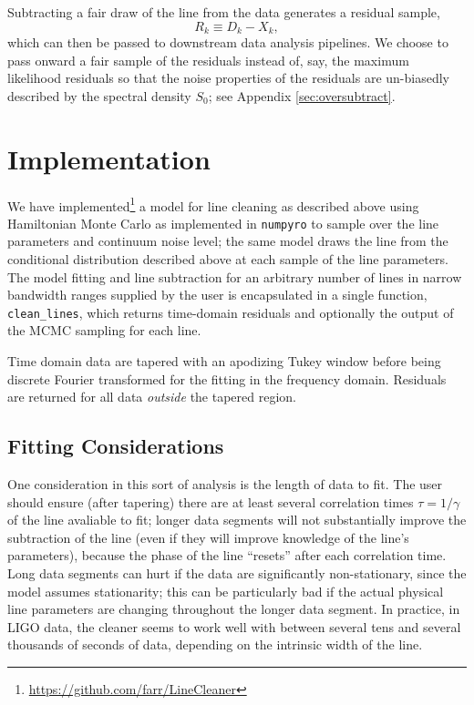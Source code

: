 \documentclass[modern]{aastex631}
\begin{document}
Subtracting a fair draw of the line from the data generates a residual sample, 
\begin{equation}
    R_k \equiv D_k - X_k,
\end{equation}
which can then be passed to downstream data analysis pipelines.  We choose to
pass onward a fair sample of the residuals instead of, say, the maximum
likelihood residuals so that the noise properties of the residuals are
un-biasedly described by the spectral density $S_0$; see Appendix
\ref{sec:oversubtract}.

\section{Implementation}

We have implemented\footnote{\url{https://github.com/farr/LineCleaner}} a model for
line cleaning as described above using Hamiltonian Monte Carlo \citep{Neal2011}
as implemented in \texttt{numpyro} \cite{bingham2019pyro,phan2019composable} to
sample over the line parameters and continuum noise level; the same model draws
the line from the conditional distribution described above at each sample of the
line parameters.  The model fitting and line subtraction for an arbitrary number
of lines in narrow bandwidth ranges supplied by the user is encapsulated in a
single function, \texttt{clean\_lines}, which returns time-domain residuals and
optionally the output of the MCMC sampling for each line.

Time domain data are tapered with an apodizing Tukey window before being
discrete Fourier transformed for the fitting in the frequency domain.  Residuals
are returned for all data \emph{outside} the tapered region.

\subsection{Fitting Considerations}

One consideration in this sort of analysis is the length of data to fit.  The
user should ensure (after tapering) there are at least several correlation times
$\tau = 1/\gamma$ of the line avaliable to fit; longer data segments will not
substantially improve the subtraction of the line (even if they will improve
knowledge of the line's parameters), because the phase of the line ``resets''
after each correlation time.  Long data segments can hurt if the data are
significantly non-stationary, since the model assumes stationarity; this can be
particularly bad if the actual physical line parameters are changing throughout
the longer data segment.  In practice, in LIGO data, the cleaner seems to work
well with between several tens and several thousands of seconds of data,
depending on the intrinsic width of the line.
\end{document}
